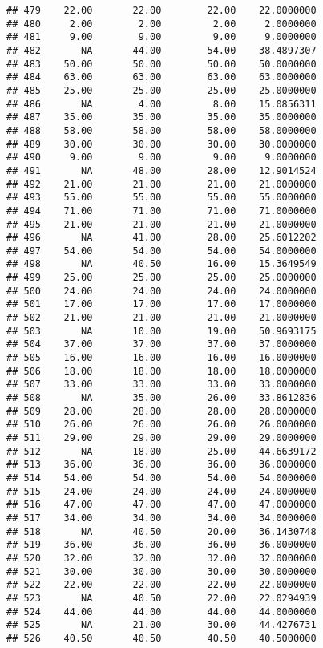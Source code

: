 \documentclass[
]{article}
\begin{document}
\begin{verbatim}
## 479    22.00       22.00        22.00    22.0000000
## 480     2.00        2.00         2.00     2.0000000
## 481     9.00        9.00         9.00     9.0000000
## 482       NA       44.00        54.00    38.4897307
## 483    50.00       50.00        50.00    50.0000000
## 484    63.00       63.00        63.00    63.0000000
## 485    25.00       25.00        25.00    25.0000000
## 486       NA        4.00         8.00    15.0856311
## 487    35.00       35.00        35.00    35.0000000
## 488    58.00       58.00        58.00    58.0000000
## 489    30.00       30.00        30.00    30.0000000
## 490     9.00        9.00         9.00     9.0000000
## 491       NA       48.00        28.00    12.9014524
## 492    21.00       21.00        21.00    21.0000000
## 493    55.00       55.00        55.00    55.0000000
## 494    71.00       71.00        71.00    71.0000000
## 495    21.00       21.00        21.00    21.0000000
## 496       NA       41.00        28.00    25.6012202
## 497    54.00       54.00        54.00    54.0000000
## 498       NA       40.50        16.00    15.3649549
## 499    25.00       25.00        25.00    25.0000000
## 500    24.00       24.00        24.00    24.0000000
## 501    17.00       17.00        17.00    17.0000000
## 502    21.00       21.00        21.00    21.0000000
## 503       NA       10.00        19.00    50.9693175
## 504    37.00       37.00        37.00    37.0000000
## 505    16.00       16.00        16.00    16.0000000
## 506    18.00       18.00        18.00    18.0000000
## 507    33.00       33.00        33.00    33.0000000
## 508       NA       35.00        26.00    33.8612836
## 509    28.00       28.00        28.00    28.0000000
## 510    26.00       26.00        26.00    26.0000000
## 511    29.00       29.00        29.00    29.0000000
## 512       NA       18.00        25.00    44.6639172
## 513    36.00       36.00        36.00    36.0000000
## 514    54.00       54.00        54.00    54.0000000
## 515    24.00       24.00        24.00    24.0000000
## 516    47.00       47.00        47.00    47.0000000
## 517    34.00       34.00        34.00    34.0000000
## 518       NA       40.50        20.00    36.1430748
## 519    36.00       36.00        36.00    36.0000000
## 520    32.00       32.00        32.00    32.0000000
## 521    30.00       30.00        30.00    30.0000000
## 522    22.00       22.00        22.00    22.0000000
## 523       NA       40.50        22.00    22.0294939
## 524    44.00       44.00        44.00    44.0000000
## 525       NA       21.00        30.00    44.4276731
## 526    40.50       40.50        40.50    40.5000000

\end{verbatim}
\end{document}
